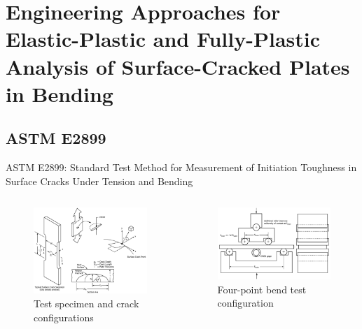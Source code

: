 \section[Engineering Approaches for EP and FP Analysis of Surface Cracks]{Engineering Approaches for Elastic-Plastic and Fully-Plastic Analysis of Surface-Cracked Plates in Bending}

\subsection{ASTM E2899}

\begin{frame}
ASTM E2899: Standard Test Method for Measurement of Initiation Toughness in Surface Cracks Under Tension and Bending
\begin{columns}[b]
\begin{column}{0.45\textwidth}
\begin{figure}
\centering
\includegraphics[width=0.9\columnwidth]{sc-terminology-e2899-modified}
\caption{Test specimen and crack configurations}
\end{figure}
\end{column}
\begin{column}{0.45\textwidth}
\begin{figure}
\centering
\includegraphics[width=0.9\columnwidth]{astm-e2899-4point-bend}
\caption{Four-point bend test configuration}
\end{figure}
\end{column}
\end{columns}
\note{
\vfill
}
\end{frame}


